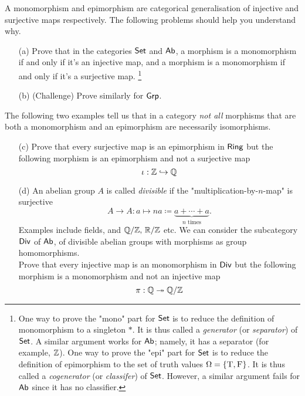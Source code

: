 \begin{problem}\label{prob 2.5}
A monomorphism and epimorphism are categorical generalisation of injective and surjective maps respectively. The following problems should help you understand why.
\begin{itemize}
\item[(a)] Prove that in the categories $\mathsf{Set}$ and $\mathsf{Ab}$, a morphism is a monomorphism if and only if it's an injective map, and a morphism is a monomorphism if and only if it's a surjective map.
\footnote{One way to prove the "mono" part for $\mathsf{Set}$ is to reduce the definition of monomorphism to a singleton $*$. It is thus called a \emph{generator} (or \emph{separator}) of $\mathsf{Set}$. A similar argument works for $\mathsf{Ab}$; namely, it has a separator (for example, $\mathbb Z$). One way to prove the "epi" part for $\mathsf{Set}$ is to reduce the definition of epimorphism to the set of truth values $\Omega=\left\{\textsc{T},\textsc{F}\right\}$. It is thus called a \emph{cogenerator} (or \emph{classifer}) of $\mathsf{Set}$. However, a similar argument fails for $\mathsf{Ab}$ since it has no classifier.}
\item[(b)] (Challenge) Prove similarly for $\mathsf{Grp}$.
\end{itemize}
The following two examples tell us that in a category \emph{not all} morphisms that are both a monomorphism and an epimorphism are necessarily isomorphisms.
\begin{itemize}
\item[(c)] Prove that every surjective map is an epimorphism in $\mathsf{Ring}$ but the following morphism is an epimorphism and not a surjective map
\[\iota: \mathbb Z \hookrightarrow \mathbb Q\]
\item[(d)] An abelian group $A$ is called \emph{divisible} if the "multiplication-by-$n$-map" is surjective
\[A \to A: a\mapsto na \coloneqq \underbrace{a+\cdots+a}_{\text{$n$ times}}.\]
Examples include fields, and $\mathbb Q/\mathbb Z,\, \mathbb R/\mathbb Z$ etc. We can consider the subcategory $\mathsf{Div}$ of $\mathsf{Ab}$, of divisible abelian groups with morphisms as group homomorphisms.\\[0.5em]
Prove that every injective map is an monomorphism in $\mathsf{Div}$ but the following morphism is a monomorphism and not an injective map
\[\pi: \mathbb Q \twoheadrightarrow \mathbb Q/\mathbb Z\]
\end{itemize}
\end{problem}

\vspace*{0.1in}

